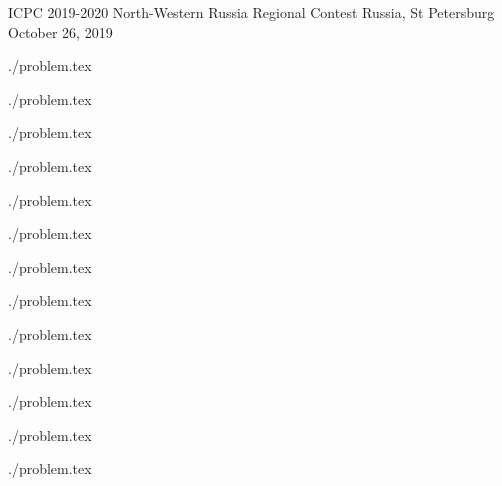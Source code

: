 \documentclass [11pt, a4paper, oneside] {article}
\begin{document}
\contest
{ICPC 2019-2020 North-Western Russia Regional Contest}%
{Russia, St Petersburg}%
{October 26, 2019}%


\renewcommand{\t}{\texttt}


\graphicspath{{../../problems/accurate-movement/statements/english/}}
  \def\ProblemIndex{A}
{./problem.tex}
\graphicspath{{../../problems/bad-treap/statements/english/}}
  \def\ProblemIndex{B}
{./problem.tex}
\graphicspath{{../../problems/cross-stitch/statements/english/}}
  \def\ProblemIndex{C}
{./problem.tex}
\graphicspath{{../../problems/double-palindrome/statements/english/}}
  \def\ProblemIndex{D}
{./problem.tex}
\graphicspath{{../../problems/equidistant/statements/english/}}
  \def\ProblemIndex{E}
{./problem.tex}
\graphicspath{{../../problems/foreach/statements/english/}}
  \def\ProblemIndex{F}
{./problem.tex}
\graphicspath{{../../problems/golf/statements/english/}}
  \def\ProblemIndex{G}
{./problem.tex}
\graphicspath{{../../problems/high/statements/english/}}
  \def\ProblemIndex{H}
{./problem.tex}
\graphicspath{{../../problems/ideal/statements/english/}}
  \def\ProblemIndex{I}
{./problem.tex}
\graphicspath{{../../problems/just-the-last-digit/statements/english/}}
  \def\ProblemIndex{J}
{./problem.tex}
\graphicspath{{../../problems/kingdom/statements/english/}}
  \def\ProblemIndex{K}
{./problem.tex}
\graphicspath{{../../problems/lengths/statements/english/}}
  \def\ProblemIndex{L}
{./problem.tex}
\graphicspath{{../../problems/managing/statements/english/}}
  \def\ProblemIndex{M}
{./problem.tex}
\end{document}
